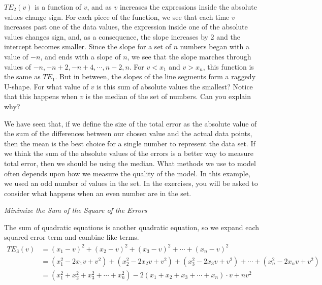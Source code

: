 \documentclass[10pt,]{book}
\theoremstyle{ptxdefinitionnotitle}
\theoremstyle{ptxdefinitiontitle}
\numberwithin{equation}{section}
\newcommand{\lt}{<}
\newcommand{\gt}{>}
\newcommand{\amp}{&}
\begin{document}
\begin{example}[{.}]
\(T{E_2}\left( v \right)\) is a function of \(v\), and as \(v\) increases the expressions inside the absolute values change sign. For each piece of the function, we see that each time \(v\) increases past one of the data values, the expression inside one of the absolute values changes sign, and, as a consequence, the slope increases by \(2\) and the intercept becomes smaller. Since the slope for a set of \(n\) numbers began with a value of \(- n\), and ends with a slope of \(n\), we see that the slope marches through values of \(- n, - n + 2, - n + 4, \cdots ,n - 2,n\). For \(v \lt x_1\) and \(v \gt x_n\), this function is the same as \(TE_1\). But in between, the slopes of the line segments form a raggedy U-shape. For what value of \(v\) is this sum of absolute values the smallest? Notice that this happens when \(v\) is the median of the set of numbers. Can you explain why? \\%
\par
\hypertarget{p-67}{}%
We have seen that, if we define the size of the total error as the absolute value of the sum of the differences between our chosen value and the actual data points, then the mean is the best choice for a single number to represent the data set. If we think the sum of the absolute values of the errors is a better way to measure total error, then we should be using the median. What methods we use to model often depends upon how we measure the quality of the model. In this example, we used an odd number of values in the set. In the exercises, you will be asked to consider what happens when an even number are in the set. \\%
\par
\hypertarget{p-68}{}%
\noindent \emph{Minimize the Sum of the Square of the Errors}%
\par
\hypertarget{p-69}{}%
The sum of quadratic equations is another quadratic equation, so we expand each squared error term and combine like terms.%
\begin{align*}
T{E_3}\left( v \right) \amp = {\left( {{x_1} - v} \right)^2} + {\left( {{x_2} - v} \right)^2} + {\left( {{x_3} - v} \right)^2} +  \cdots  + {\left( {{x_n} - v} \right)^2}\\
\amp = \left( {x_1^2 - 2{x_1}v + {v^2}} \right) + \left( {x_2^2 - 2{x_2}v + {v^2}} \right) + \left( {x_3^2 - 2{x_3}v + {v^2}} \right) +  \cdots  + \left( {x_n^2 - 2{x_n}v + {v^2}} \right)\\
\amp = \left( {x_1^2 + x_2^2 + x_3^2 +  \cdots  + x_n^2} \right) - 2\left( {{x_1} + {x_2} + {x_3} +  \cdots  + {x_n}} \right) \cdot v + n{v^2}

\end{align*}
\end{example}
\end{document}
